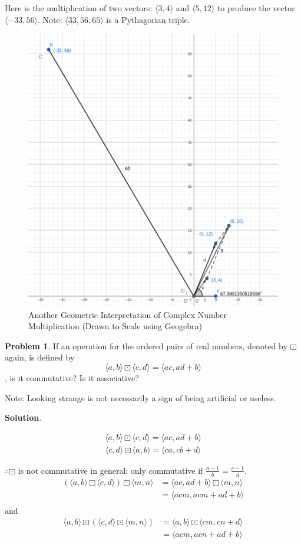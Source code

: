 \documentclass[english,notitlepage,smartquotes]{hgbreport}
\theoremstyle{definition}
\theoremstyle{problem}
\newtheorem{problem}{Problem}
\theoremstyle{remark}
\theoremstyle{plain}
\begin{document}
Here is the multiplication of two vectors: $\langle 3,4\rangle$ and $\langle 5,12\rangle$ to produce the vector $\langle -33,56\rangle$. Note: $\langle 33,56,65\rangle$ is a Pythagorian triple.
\begin{figure}[h]
\begin{center}
\caption{Another Geometric Interpretation of Complex Number Multiplication (Drawn to Scale using Geogebra)}
\label{fig:complexmult2}
\includegraphics[width=.5\textwidth]{c1xc2-2} 
\end{center}
\end{figure}

\begin{problem}
\label{pr:affine}
If an operation for the ordered pairs of real numbers, denoted by $\boxdot$ again, is defined by
$$
\langle a,b\rangle\boxdot\langle c,d\rangle=\langle ac,ad+b\rangle
$$
, is it commutative? Is it associative?

Note: Looking strange is not necessarily a sign of being artificial or useless.
\end{problem}

\textbf{Solution}.

\begin{align*}
\langle a,b\rangle\boxdot\langle c,d\rangle=\langle ac,ad+b\rangle
\end{align*}
\begin{align*}
\langle c,d\rangle\boxdot\langle a,b\rangle=\langle ca,cb+d\rangle
\end{align*}

$\therefore \boxdot$ is not commutative in general; only commutative if $\frac{a-1}{b}=\frac{c-1}{d}$.
\begin{align*}
(\langle a,b\rangle\boxdot\langle c,d\rangle)\boxdot\langle m, n\rangle
&=\langle ac, ad+b\rangle\boxdot\langle m,n\rangle\\
&=\langle acm,acm+ad+b\rangle\\
\end{align*}
and
\begin{align*}
\langle a,b\rangle\boxdot(\langle c,d\rangle\boxdot\langle m, n\rangle)
&=\langle a,b\rangle\boxdot\langle cm,cn+d\rangle\\
&=\langle acm,acn+ad+b\rangle\\
\end{align*}
\end{document}
